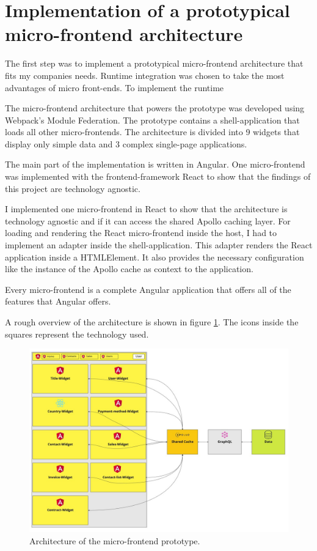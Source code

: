 
\section{Implementation of a prototypical micro-frontend architecture}

The first step was to implement a prototypical micro-frontend architecture that fits my companies needs. Runtime integration was chosen to take the most advantages of micro front-ends. To implement the runtime

The micro-frontend architecture that powers the prototype was developed using Webpack's Module Federation. The prototype contains a shell-application that loads all other micro-frontends. The architecture is divided into 9 widgets that display only simple data and 3 complex single-page applications.

The main part of the implementation is written in Angular. One micro-frontend was implemented with the frontend-framework React to show that the findings of this project are technology agnostic.

I implemented one micro-frontend in React to show that the architecture is technology agnostic and if it can access the shared Apollo caching layer. For loading and rendering the React micro-frontend inside the host, I had to implement an adapter inside the shell-application. This adapter renders the React application inside a HTMLElement. It also provides the necessary configuration like the instance of the Apollo cache as context to the application.

Every micro-frontend is a complete Angular application that offers all of the features that Angular offers.

A rough overview of the architecture is shown in figure \ref{figure:methods:ui-dashboard-architecture}. The icons inside the squares represent the technology used.

\ifshowImages
\begin{figure}[H]
\centering
\includegraphics[width=0.8\linewidth]{images/ui-dashboard-architecture.jpeg}
\caption{Architecture of the micro-frontend prototype.}\label{figure:methods:ui-dashboard-architecture}
\end{figure}
\fi

